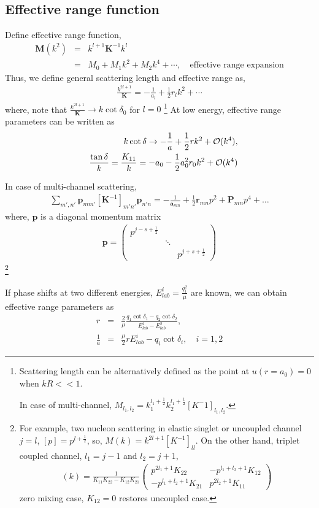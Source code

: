 \documentclass[10pt]{article}
\def\bm{\boldsymbol}
\newcommand{\bea}{\begin{eqnarray}}
\newcommand{\eea}{\end{eqnarray}}
\newcommand{\no}{\nonumber \\}
\def\vp{{\bm p}}
\begin{document}
 
\subsection{Effective range function}
Define effective range function,
\bea
{\bm M}(k^2)&=&k^{l+1}{\bm K}^{-1} k^{l} \no
  &=& M_0+M_1 k^2+M_2 k^4+\cdots,\quad\mbox{effective range expansion}
\eea
Thus, we define general scattering length and effective range as,
\bea
\frac{k^{2l+1}}{\bm K}=-\frac{1}{a_l}+\frac{1}{2}r_l k^2+\cdots
\eea
where, note that $\frac{k^{2l+1}}{\bm K}\to k\cot\delta_0$ for $l=0$
\footnote{ Scattering length can be alternatively defined as the point at $u(r=a_0)=0$ when $kR<<1$.

In case of multi-channel, $M_{l_1,l_2}=k_1^{l_1+\frac{1}{2}}k_2^{l_1+\frac{1}{2}}[K^-1]_{l_1,l_2}$.
}
At low energy, effective range parameters 
can be written as
\bea
& &k\cot\delta\to -\frac{1}{a}+\frac{1}{2} r k^2+{\cal O}(k^4),\no
& &\frac{\tan\delta}{k}=\frac{K_{11}}{k}
  =-a_0-\frac{1}{2} a_0^2 r_0 k^2+{\cal O}(k^4)
\eea

In case of multi-channel scattering,
\bea 
\sum_{m',n'} \vp_{mm'}[{\bm K}^{-1}]_{m'n'}\vp_{n'n}
 =-\frac{1}{{\bm a}_{mn}}+\frac{1}{2}{\bm r}_{mn}p^2+{\bm P}_{mn}p^4+\dots
\eea 
where, ${\bm p}$ is a diagonal momentum matrix
\bea 
{\bm p}=\left(\begin{array}{ccc} p^{j-s+\frac{1}{2}} &  & \\  &\ddots   &   \\
                           &  & p^{j+s+\frac{1}{2}}  \end{array}\right) 
\eea 
\footnote{ 
For example, two nucleon scattering in elastic singlet or uncoupled channel $j=l$,
$[p]=p^{l+\frac{1}{2}}$, so, $M(k)=k^{2l+1} [K^{-1}]_{ll}$. 
On the other hand, triplet coupled channel, $l_1=j-1$ and $l_2=j+1$, 
\bea 
[M](k)=\frac{1}{K_{11}K_{22}-K_{12}K_{21}}
\left(\begin{array}{cc} 
    p^{2l_1+1} K_{22} & -p^{l_1+l_2+1} K_{12}  \\
    -p^{l_1+l_2+1} K_{21} & p^{2l_2+1} K_{11}  \end{array}\right)
\eea 
zero mixing case, $K_{12}=0$ restores uncoupled case.
}


If phase shifts at two different energies,
$E^i_{lab}=\frac{q_i^2}{\mu}$ are known, we can obtain 
effective range parameters as
\bea
r&=&\frac{2}{\mu}\frac{ q_1 \cot\delta_1-q_2\cot\delta_2  }{E_{lab}^1-E_{lab}^2},\no
\frac{1}{a}&=&\frac{\mu}{2}r E_{lab}^{i}-q_i\cot\delta_i,\quad
i=1,2
\eea
\end{document}
